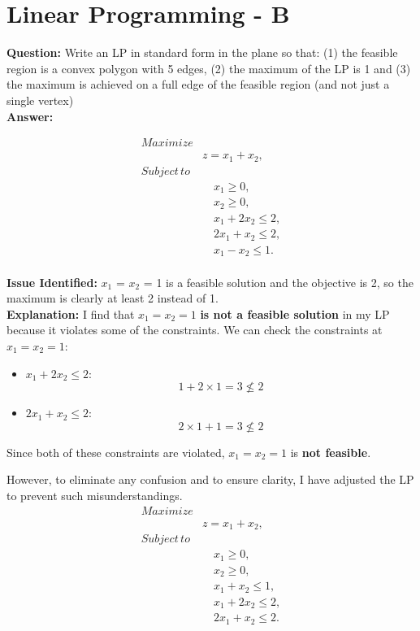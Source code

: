\documentclass[12pt]{article}
\begin{document}
\section{Linear Programming - B}
\textbf{Question:}
Write an LP in standard form in the plane so that: (1) the feasible region is a convex polygon with 5 edges, (2) the maximum of the LP is 1 and (3) the maximum is achieved on a full edge of the feasible region (and not just a single vertex)\\
\textbf{Answer:}

\[
\begin{aligned}
Maximize& \\
&z = x_1 + x_2, \\
Subject \, to& \\
& \quad x_1 \geq 0, \\
& \quad x_2 \geq 0, \\
& \quad x_1 + 2x_2 \leq 2, \\
& \quad 2x_1 + x_2 \leq 2, \\
& \quad x_1 - x_2 \leq 1.
\end{aligned}
\]\\
\textbf{Issue Identified:}
$x_1$ = $x_2$ = 1 is a feasible solution and the objective is 2, so the maximum is clearly at least 2 instead of 1.\\
\textbf{Explanation:}
I find that \(x_1 = x_2 = 1\) \textbf{is not a feasible solution} in my LP because it violates some of the constraints. We can check the constraints at \(x_1 = x_2 = 1\):
\begin{itemize}
    \item \(x_1 + 2x_2 \leq 2\):
    \[
    1 + 2 \times 1 = 3 \not\leq 2
    \]
    \item \(2x_1 + x_2 \leq 2\):
    \[
    2 \times 1 + 1 = 3 \not\leq 2
    \]
\end{itemize}
Since both of these constraints are violated, \(x_1 = x_2 = 1\) is \textbf{not feasible}.

However, to eliminate any confusion and to ensure clarity, I have adjusted the LP to prevent such misunderstandings. 
\[
\begin{aligned}
Maximize& \\
&z = x_1 + x_2, \\
Subject \, to& \\
& \quad x_1 \geq 0, \\
& \quad x_2 \geq 0, \\
& \quad x_1 + x_2 \leq 1, \\
& \quad x_1 + 2x_2 \leq 2, \\
& \quad 2x_1 + x_2 \leq 2.
\end{aligned}
\]
\end{document}
